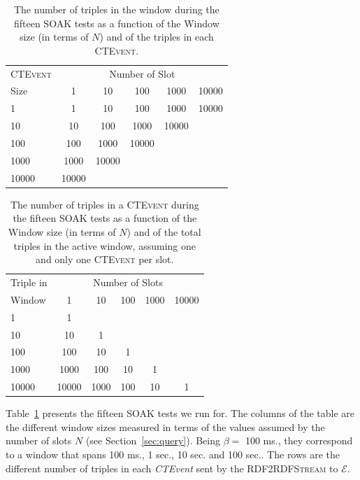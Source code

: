 \begin{table}[htb]
\centering
\small
 \begin{tabular}{l| ccccc}
	  	\hline
		\textsc{CTEvent}  &\multicolumn{5}{c}{Number of Slot}  \\
		Size  & 1 & 10 & 100 & 1000&10000 \\
		\hline	
		1 & 1& 10 & 100 & 1000&10000 \\
		10  & 10 & 100 & 1000&10000 \\
		100 & 100&1000&10000  \\
		1000 &1000 & 10000 \\
		10000&10000  \\
		\hline 
	\end{tabular}
	 \vspace{10pt}
	\caption[SOAK Tests Summary Table]{The number of triples in the window during the fifteen SOAK tests as a function of the Window size (in terms of $N$) and of the triples in each \textsc{CTEvent}.}
	\label{tab:soaktests}
\end{table}

\begin{table}[htb]
	\centering
	\small
	\begin{tabular}{l | ccccc} %
	  	\hline
		Triple in & \multicolumn{5}{c}{Number of Slots}  \\
		Window  & 1 & 10 & 100 & 1000&10000\\
		\hline
		1  	 & 1\\
		10   & 10  & 1 \\
		100  & 100 & 10 & 1\\
		1000 & 1000& 100& 10& 1\\
		10000& 10000 & 1000& 100& 10& 1\\
		\hline %
	 \end{tabular}
	\caption[SOAK Tests Summary Table Alternative Layout]{The number of triples in a \textsc{CTEvent} during the fifteen SOAK tests as a function of the Window size (in terms of $N$) and of the total triples in the active window, assuming one and only one \textsc{CTEvent} per slot.}
	\label{tab:soaktests-alt}
\end{table}

Table~\ref{tab:soaktests} presents the fifteen SOAK tests we run for. The columns of the table are the different window sizes measured in terms of the values assumed by the number of slots $N$ (see Section~\ref{sec:query}).  Being $\beta=$ 100 ms., they correspond to a window that spans 100 ms., 1 sec., 10 sec. and 100 sec.. The rows are the different number of triples in each \textit{CTEvent} sent by the \textsc{RDF2RDFStream} to $\mathcal{E}$.%

